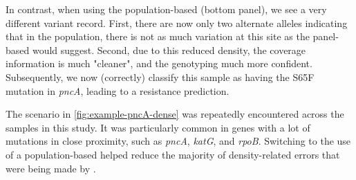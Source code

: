 In contrast, when using the population-based \prg{} (bottom panel), we see a very different variant record. First, there are now only two alternate alleles indicating that in the population, there is not as much variation at this site as the panel-based \prg{} would suggest. Second, due to this reduced density, the coverage information is much "cleaner", and the genotyping much more confident. Subsequently, we now (correctly) classify this sample as having the S65F mutation in \textit{pncA}, leading to a resistance prediction.

The scenario in \autoref{fig:example-pncA-dense} was repeatedly encountered across the samples in this study. It was particularly common in genes with a lot of mutations in close proximity, such as \textit{pncA}, \textit{katG}, and \textit{rpoB}. Switching to the use of a population-based \prg{} helped reduce the majority of density-related errors that were being made by \drprg{}.

